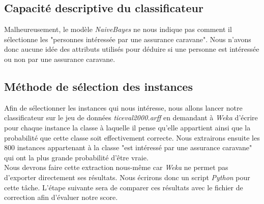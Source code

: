 \documentclass[10pt,a4paper]{article}
\begin{document}
			\subsection{Capacité descriptive du classificateur}
			
				Malheureusement, le modèle \textit{NaiveBayes} ne nous indique pas comment il sélectionne les "personnes intéressée par une assurance caravane". Nous n'avons donc aucune idée des attributs utilisés pour déduire si une personne est intéressée ou non par une assurance caravane.
				
			\subsection{Méthode de sélection des instances}
			
				Afin de sélectionner les instances qui nous intéresse, nous allons lancer notre classificateur sur le jeu de données \textit{ticeval2000.arff} en demandant à \textit{Weka} d'écrire pour chaque instance la classe à laquelle il pense qu'elle appartient ainsi que la probabilité que cette classe soit effectivement correcte. Nous extrairons ensuite les 800 instances appartenant à la classe "est intéressé par une assurance caravane" qui ont la plus grande probabilité d'être vraie.\\
				
				Nous devrons faire cette extraction nous-même car \textit{Weka} ne permet pas d'exporter directement ses résultats. Nous écrirons donc un script \textit{Python} pour cette tâche. L'étape suivante sera de comparer ces résultats avec le fichier de correction afin d'évaluer notre score.
          	
\end{document}
